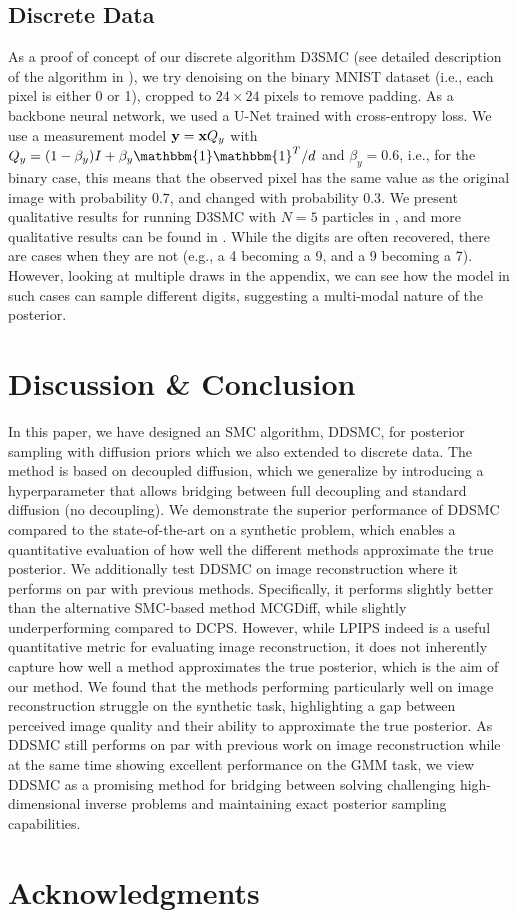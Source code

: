 \documentclass{proc}
\newcommand{\suppmat}{appendix\xspace}
\begin{document}
\subsection{Discrete Data}
As a proof of concept of our discrete algorithm D3SMC (see detailed description of the algorithm in ), we try denoising on the binary MNIST dataset (i.e., each pixel is either 0 or 1), cropped to $24 \times 24$ pixels to remove padding. As a backbone neural network, we used a U-Net \citep{ronneberger_u-net_2015} trained with cross-entropy loss. We use a measurement model $\mathbf{y} = \mathbf{x} Q_y$ with $Q_y = (1-\beta_y) I + \beta_y \mathbbm{1}\mathbbm{1}^T/d$ and $\beta_y=0.6$, i.e., for the binary case, this means that the observed pixel has the same value as the original image with probability $0.7$, and changed with probability $0.3$. We present qualitative results for running D3SMC with $N=5$ particles in , and more qualitative results can be found in . While the digits are often recovered, there are cases when they are not (e.g., a 4 becoming a 9, and a 9 becoming a 7). However, looking at multiple draws in the \suppmat, we can see how the model in such cases can sample different digits, suggesting a multi-modal nature of the posterior. 

\section{Discussion \& Conclusion}
In this paper, we have designed an SMC algorithm, DDSMC, for posterior sampling with diffusion priors which we also extended to discrete data. The method is based on decoupled diffusion, which we generalize by introducing a hyperparameter that allows bridging between full decoupling and standard diffusion (no decoupling). We demonstrate the superior performance of DDSMC compared to the state-of-the-art on a synthetic problem, which enables a quantitative evaluation of how well the different methods approximate the true posterior. We additionally test DDSMC on image reconstruction where it performs on par with previous methods. Specifically, it performs slightly better than the alternative SMC-based method MCGDiff, while slightly underperforming compared to DCPS. However, while LPIPS indeed is a useful quantitative metric for evaluating image reconstruction, it does not inherently capture how well a method approximates the true posterior, which is the aim of our method. We found that the methods performing particularly well on image reconstruction struggle on the synthetic task, highlighting a gap between perceived image quality and their ability to approximate the true posterior. As DDSMC still performs on par with previous work on image reconstruction while at the same time showing excellent performance on the GMM task, we view DDSMC as a promising method for bridging between solving challenging high-dimensional inverse problems and maintaining exact posterior sampling capabilities.
 

\section*{Acknowledgments}





\newpage
\appendix
\onecolumn

\end{document}
